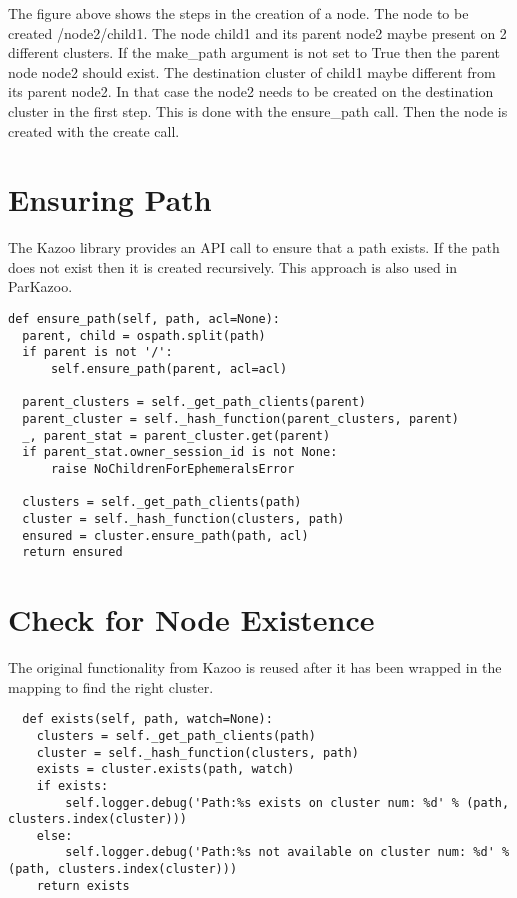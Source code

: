 

The figure above shows the steps in the creation of a node. The node to be created /node2/child1. The node child1 and its parent node2 maybe present on 2 different clusters. If the make\_path argument is not set to True then the parent node node2 should exist. The destination cluster of child1 maybe different from its parent node2. In that case the node2 needs to be created on the destination cluster in the first step. This is done with the ensure\_path call. Then the node is created with the create call.


\section{Ensuring Path}
The Kazoo library provides an API call to ensure that a path exists. If the path does not exist then it is created recursively. This approach is also used in ParKazoo.

\begin{lstlisting}
def ensure_path(self, path, acl=None):
  parent, child = ospath.split(path)
  if parent is not '/':
      self.ensure_path(parent, acl=acl)

  parent_clusters = self._get_path_clients(parent)
  parent_cluster = self._hash_function(parent_clusters, parent)
  _, parent_stat = parent_cluster.get(parent)
  if parent_stat.owner_session_id is not None:
      raise NoChildrenForEphemeralsError

  clusters = self._get_path_clients(path)
  cluster = self._hash_function(clusters, path)
  ensured = cluster.ensure_path(path, acl)
  return ensured
\end{lstlisting}

\section{Check for Node Existence}
The original functionality from Kazoo is reused after it has been wrapped in the mapping to find the right cluster.

\begin{lstlisting}
  def exists(self, path, watch=None):
    clusters = self._get_path_clients(path)
    cluster = self._hash_function(clusters, path)
    exists = cluster.exists(path, watch)
    if exists:
        self.logger.debug('Path:%s exists on cluster num: %d' % (path, clusters.index(cluster)))
    else:
        self.logger.debug('Path:%s not available on cluster num: %d' % (path, clusters.index(cluster)))
    return exists
\end{lstlisting}

